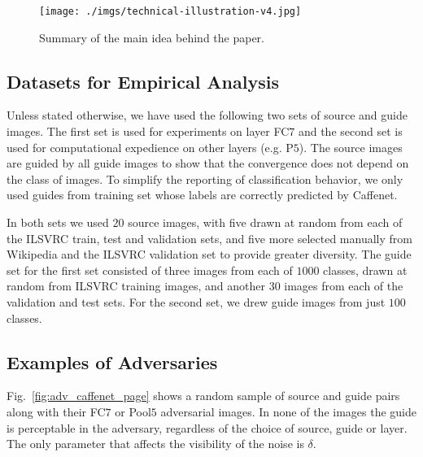\documentclass{article} %
\begin{document}
\begin{figure}[h]
\centering
\texttt{[image: ./imgs/technical-illustration-v4.jpg]}
\caption{Summary of the main idea behind the paper.} \label{fig:illustrate}
\vspace*{-0.2cm}
\end{figure}\subsection{Datasets for Empirical Analysis}

Unless stated otherwise,  we have used the following two sets of source and
guide images. The first set is used for experiments on layer FC$7$ and the
second set is used for computational expedience on other layers (e.g.  P$5$).
The source images are guided by all guide images to show that the convergence
does not depend on the class of images. To simplify the reporting of
classification behavior, we only used guides from training set whose labels are
correctly predicted by Caffenet.

In both sets we used $20$ source images, with five drawn at random from each of
the ILSVRC train, test and validation sets, and five more selected manually
from Wikipedia and the ILSVRC validation set to provide greater diversity.  The
guide set for the first set consisted of three images from each of $1000$
classes, drawn at random from ILSVRC training images, and another $30$ images
from each of the validation and test sets. For the second set, we drew guide
images from just $100$ classes.

\subsection{Examples of Adversaries}
Fig.~\ref{fig:adv_caffenet_page} shows a random sample of source and guide
pairs along with their FC$7$ or Pool$5$ adversarial images. In none of the images the guide is perceptable in the adversary, regardless of the
choice of source, guide or layer. The only parameter that affects the
visibility of the noise is $\delta$.
\end{document}
